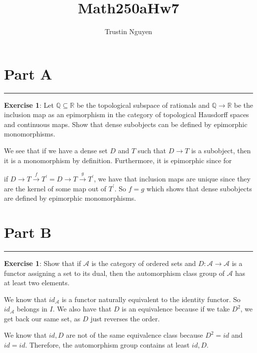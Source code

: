 \documentclass{article}
\title{Math250aHw7}
\author{Trustin Nguyen}
\begin{document}
    \maketitle

\reversemarginpar

\section*{Part A}
\hrule
\textbf{Exercise 1}: Let $\mathbb{Q} \subseteq \mathbb{R}$ be the topological subspace of rationals and $\mathbb{Q} \rightarrow \mathbb{R}$ be the inclusion map as an epimorphism in the category of topological Hausdorff spaces and continuous maps. Show that dense subobjects can be defined by epimorphic monomorphisms.
    \begin{answer}
        We see that if we have a dense set $D$ and $T$ such that $D \rightarrow T$ is a subobject, then it is a monomorphism by definition. Furthermore, it is epimorphic since for
            \begin{center}
            \end{center}
        if $D \rightarrow T \xrightarrow{f} T^{\prime} = D \rightarrow T \xrightarrow{g}  T^{\prime}$, we have that inclusion maps are unique since they are the kernel of some map out of $T^{\prime}$. So $f = g$ which shows that dense subobjects are defined by epimorphic monomorphisms. 
    \end{answer}

\section*{Part B}
\hrule
\textbf{Exercise 1}: Show that if $\mathcal{A}$ is the category of ordered sets and $D : \mathcal{A} \rightarrow \mathcal{A}$ is a functor assigning a set to its dual, then the automorphism class group of $\mathcal{A}$ has at least two elements.
    \begin{answer}
        We know that $id_{\mathcal{A}}$ is a functor naturally equivalent to the identity functor. So $id_{\mathcal{A}}$ belongs in $I$. We also have that $D$ is an equivalence because if we take $D^{2}$, we get back our same set, as $D$ just reverses the order.

        We know that $id, D$ are not of the same equivalence class because $D^{2} = id$ and $id = id$. Therefore, the automorphism group contains at least $id, D$.
    \end{answer}
\end{document}
